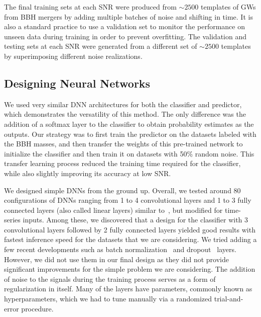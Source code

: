 \documentclass[aps,prd,%
amsmath,floats,floatfix, twocolumn, superscriptaddress,nofootinbib,showpacs]{revtex4-1}
\begin{document}
The final training sets at each SNR were produced from  \(\sim 2500\) templates of GWs from BBH mergers by adding multiple batches of noise and shifting in time. It is also a standard practice to use a validation set to monitor the performance on unseen data during training in order to prevent overfitting. The validation and testing sets at each SNR were generated from a different set of \(\sim 2500\) templates by superimposing different noise realizations. 

\subsection*{Designing Neural Networks}

We used very similar DNN architectures for both the classifier and predictor, which demonstrates the versatility of this method. The only difference was the addition of a softmax layer to the classifier to obtain probability estimates as the outputs. Our strategy was to first train the predictor on the datasets labeled with the BBH masses, and then transfer the weights of this pre-trained network to initialize the classifier and then train it on datasets with 50\% random noise. This transfer learning process reduced the training time required for the classifier, while also slightly improving its accuracy at low SNR.

We designed simple DNNs from the ground up. Overall, we tested around 80 configurations of DNNs ranging from 1 to 4 convolutional layers and 1 to 3 fully connected layers (also called linear layers) similar to~\cite{lecun98-cnn}, but modified for time-series inputs. Among these, we discovered that a design for the classifier with 3 convolutional layers followed by 2 fully connected layers yielded good results with fastest inference speed for the datasets that we are considering. We tried adding a few recent developments such as batch normalization~\cite{BatchNormalization} and dropout~\cite{Dropout} layers. However, we did not use them in our final design as they did not provide significant improvements for the simple problem we are considering. The addition of noise to the signals during the training process serves as a form of regularization in itself. Many of the layers have parameters, commonly known as hyperparameters, which we had to tune manually via a randomized trial-and-error procedure. 
\end{document}
